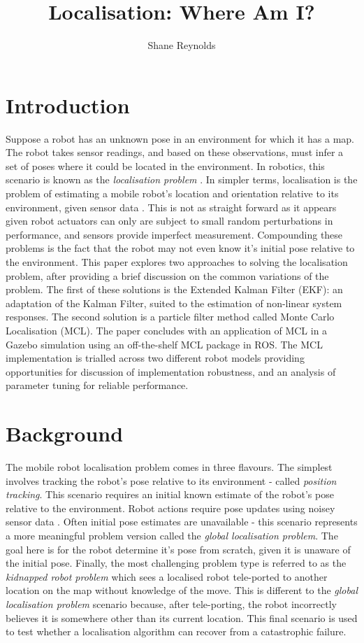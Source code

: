 \documentclass[a4paper]{article}
\begin{document}
\title{Localisation: Where Am I?}
\author{Shane Reynolds}
\maketitle
\tableofcontents
\newpage
\section{Introduction}
Suppose a robot has an unknown pose in an environment for which it has a map. The robot takes sensor readings, and based on these observations, must infer a set of poses where it could be located in the environment. In robotics, this scenario is known as the \textit{localisation problem} \cite{Cox:1991, Wang:1988}. In simpler terms, localisation is the problem of estimating a mobile robot's location and orientation relative to its environment, given sensor data \cite{Thrun:2001}. This is not as straight forward as it appears given robot actuators can only are subject to small random perturbations in performance, and sensors provide imperfect measurement. Compounding these problems is the fact that the robot may not even know it's initial pose relative to the environment. This paper explores two approaches to solving the localisation problem, after providing a brief discussion on the common variations of the problem. The first of these solutions is the Extended Kalman Filter (EKF): an adaptation of the Kalman Filter, suited to the estimation of non-linear system responses. The second solution is a particle filter method called Monte Carlo Localisation (MCL). The paper concludes with an application of MCL in a Gazebo simulation using an off-the-shelf MCL package in ROS. The MCL implementation is trialled across two different robot models providing opportunities for discussion of implementation robustness, and an analysis of parameter tuning for reliable performance.

\section{Background}
The mobile robot localisation problem comes in three flavours. The simplest involves tracking the robot's pose relative to its environment - called \textit{position tracking}. This scenario requires an initial known estimate of the robot's pose relative to the environment. Robot actions require pose updates using noisey sensor data \cite{Thrun:1999}. Often initial pose estimates are unavailable - this scenario represents a more meaningful problem version called the \textit{global localisation problem}. The goal here is for the robot determine it's pose from scratch, given it is unaware of the initial pose. Finally, the most challenging problem type is referred to as the \textit{kidnapped robot problem} which sees a localised robot tele-ported to another location on the map without knowledge of the move. This is different to the \textit{global localisation problem} scenario because, after tele-porting, the robot incorrectly believes it is somewhere other than its current location. This final scenario is used to test whether a localisation algorithm can recover from a catastrophic failure.
\end{document}
